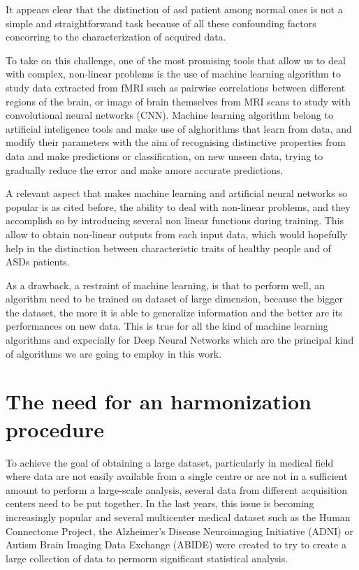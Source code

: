 \documentclass[10pt]{report}
\begin{document}
It appears clear that the distinction of asd patient among normal ones is not a simple and straightforwand task because of all these confounding factors concorring to the characterization of acquired data.

To take on this challenge, one of the most promising tools that allow us to deal with complex, non-linear problems is the use of machine learning algorithm to study data extracted from fMRI such as pairwise correlations between different regions of the brain, or image of brain themselves from MRI scans to study with convolutional neural networks (CNN).
Machine learning algorithm belong to artificial inteligence tools and make use of alghorithms that learn from data, and modify their parameters with the aim of recognising distinctive properties from data and make predictions or classification, on new unseen data, trying to gradually reduce the error and make amore accurate predictions.

A relevant aspect that makes machine learning and artificial neural networks so popular is as cited before, the ability to deal with non-linear problems, and they accomplish so by introducing several non linear functions during training. This allow to obtain non-linear outputs from each input data, which would hopefully help in the distinction between characteristic traits of healthy people and of ASDs patients.

As a drawback, a restraint of machine learning, is that to perform well, an algorithm need to be trained on dataset of large dimension, because the bigger the dataset, the more it is able to generalize information and the better are its performances on new data.
This is true for all the kind of machine learning algorithms and expecially for Deep Neural Networks which are the principal kind of algorithms we are going to employ in this work.
\section{The need for an harmonization procedure}

To achieve the goal of obtaining a large dataset, particularly in medical field where data are not easily available from a single centre or are not in a sufficient amount to perform a large-scale analysis, several data from different acquisition centers need to be put together.
In the last years, this issue is becoming increasingly popular and several multicenter medical dataset such as the Human Connectome Project, the Alzheimer’s Disease Neuroimaging Initiative (ADNI) or Autism Brain Imaging Data Exchange (ABIDE) were created to try to create a large collection of data to permorm significant statistical analysis.
\end{document}
